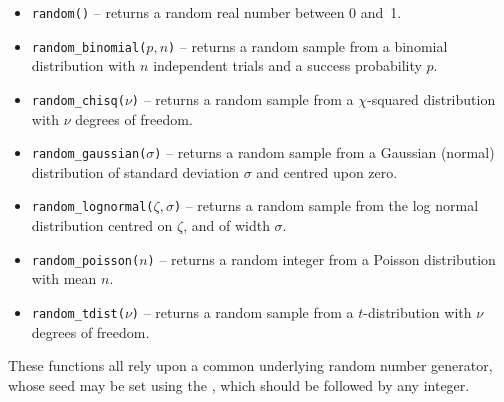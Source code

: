 \begin{itemize}
\item {\tt random()} -- returns a random real number between 0 and~1.
\item {\tt random\_binomial($p,n$)} -- returns a random sample from a binomial distribution with $n$ independent trials and a success probability $p$.
\item {\tt random\_chisq($\nu$)} -- returns a random sample from a $\chi$-squared distribution with $\nu$ degrees of freedom.
\item {\tt random\_gaussian($\sigma$)} -- returns a random sample from a Gaussian (normal) distribution of standard deviation $\sigma$ and centred upon zero.
\item {\tt random\_lognormal($\zeta,\sigma$)} -- returns a random sample from the log normal distribution centred on $\zeta$, and of width $\sigma$.
\item {\tt random\_poisson($n$)} -- returns a random integer from a Poisson distribution with mean $n$.
\item {\tt random\_tdist($\nu$)} -- returns a random sample from a $t$-distribution with $\nu$ degrees of freedom.
\end{itemize}

\noindent These functions all rely upon a common underlying random number
generator, whose seed may be set using the , which should be
followed by any integer.


